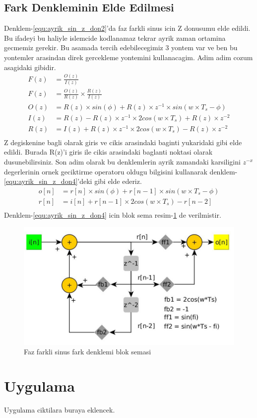 \documentclass[10pt,a4paper]{article}
\begin{document}
\subsection{Fark Denkleminin Elde Edilmesi}
Denklem-\ref{equ:ayrik_sin_z_don2}'da faz farkli sinus icin Z donusumu elde edildi. Bu ifadeyi bu haliyle islemcide kodlanamaz tekrar ayrik zaman ortamina gecmemiz gerekir. Bu asamada tercih edebilecegimiz 3 yontem var ve ben bu yontemler arasindan direk gercekleme yontemini kullanacagim. Adim adim cozum asagidaki gibidir.
\begin{equation} \label{equ:ayrik_sin_z_don3} 
\begin{split}
	F(z) &= \frac{O(z)}{I(z)}	\\
	F(z) &= \frac{O(z)}{R(z)} \times \frac{R(z)}{I(z)}	\\
	O(z) &= R(z) \times sin(\phi) + R(z) \times z^{-1} \times sin(w \times T_s - \phi) \\
	I(z) &= R(z) - R(z) \times z^{-1} \times 2cos(w \times T_s) + R(z) \times z^{-2} \\
	R(z) &= I(z) + R(z) \times z^{-1} \times 2cos(w \times T_s) - R(z) \times z^{-2} \\
\end{split}					
\end{equation}
Z degiskenine bagli olarak giris ve cikis arasindaki baginti yukaridaki gibi elde edildi. Burada R(z)'i giris ile cikis arasindaki baglanti noktasi olarak dusunebilirsiniz. Son adim olarak bu denklemlerin ayrik zamandaki karsiligini $z^{-x}$ degerlerinin ornek geciktirme operatoru oldugu bilgisini kullanarak denklem-\ref{equ:ayrik_sin_z_don4}'deki gibi elde ederiz.
\begin{equation} \label{equ:ayrik_sin_z_don4} 
\begin{split}
	o[n] &= r[n] \times sin(\phi) + r[n - 1] \times sin(w \times T_s - \phi) \\
	r[n] &= i[n] + r[n - 1] \times 2cos(w \times T_s) - r[n - 2] \\
\end{split}					
\end{equation}
Denklem-\ref{equ:ayrik_sin_z_don4} icin blok sema resim-\ref{fig:blok_sema} de verilmistir.
\begin{figure}
\centering
	\includegraphics[width=0.7\linewidth]{blok_sema_kirpildi}
	\caption{Faz farkli sinus fark denklemi blok semasi}
\label{fig:blok_sema}
\end{figure}

\section{Uygulama}
Uygulama ciktilara buraya eklencek.
\end{document}
